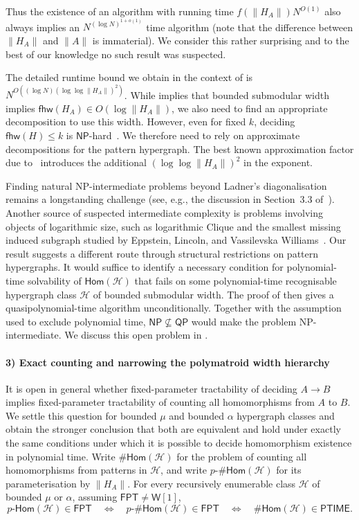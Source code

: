 \documentclass[11pt,letterpaper]{article}
\theoremstyle{definition}
\theoremstyle{remark}
\newcommand{\cH}{\mathcal H}
\newcommand{\Hom}{\mathsf{Hom}}
\newcommand{\pHom}{p\text{-}\mathsf{Hom}}
\newcommand{\fhw}{\mathsf{fhw}}
\newcommand{\FPT}{\ensuremath{\mathsf{FPT}}}
\newcommand{\PTIME}{\mathsf{PTIME}}
\newcommand{\NP}{\mathsf{NP}}
\newcommand{\QP}{\mathsf{QP}}
\newcommand{\wone}{\ensuremath{\mathsf{W}[1]}}
\providecommand{\fhw}{\operatorname{fhw}}
\providecommand{\FPT}{\ensuremath{\mathsf{FPT}}}
\providecommand{\PTIME}{\mathsf{PTIME}}
\begin{document}
Thus the existence of an algorithm with running time $f(\lVert H_A\rVert)N^{O(1)}$ also always implies an $N^{(\log N)^{1+o(1)}}$ time algorithm (note that the difference between $\lVert H_A\rVert$ and $\lVert A \rVert$ is immaterial).
We consider this rather surprising and to the best of our knowledge no such result was suspected.

The detailed runtime bound we obtain in the context of   is $N^{O((\log N)(\log\log \lVert H_A \rVert)^2)}$. While  implies that bounded submodular width implies $\fhw(H_A) \in O(\log \lVert H_A \rVert)$, we also need to find an appropriate decomposition to use this width. However, even for fixed $k$, deciding $\fhw(H)\le k$ is $\NP$-hard~\cite{DBLP:journals/jacm/GottlobLPR21}. We therefore need to rely on approximate decompositions for the pattern hypergraph. The best known approximation factor due to~\cite{KorchemnaEtAl2024} introduces the additional $(\log\log \lVert H_A \rVert)^2$ in the exponent.


Finding natural NP-intermediate problems beyond Ladner's diagonalisation remains a longstanding challenge (see, e.g., the discussion in Section~3.3 of~\cite{AroraBarak2009}). Another source of suspected intermediate complexity is problems involving objects of logarithmic size, such as logarithmic Clique and the smallest missing induced subgraph studied by Eppstein, Lincoln, and Vassilevska Williams~\cite{EppsteinLincolnWilliams2023}. Our result suggests a different route through structural restrictions on pattern hypergraphs. It would suffice to identify a necessary condition for polynomial-time solvability of $\Hom(\cH)$ that fails on some polynomial-time recognisable hypergraph class $\cH$ of bounded submodular width. The proof of  then gives a quasipolynomial-time algorithm unconditionally. Together with the assumption used to exclude polynomial time, $\NP\nsubseteq\QP$ would make the problem NP-intermediate. We discuss this open problem in .


\paragraph{3) Exact counting and narrowing the polymatroid width hierarchy}
It is open in general whether fixed-parameter tractability of deciding
$A\to B$ implies fixed-parameter tractability of counting all
homomorphisms from $A$ to $B$. We settle this question for
bounded $\mu$ and bounded $\alpha$ hypergraph classes and obtain the stronger conclusion that both are equivalent and hold under exactly the same conditions under which it is possible to decide homomorphism existence in polynomial time. Write $\mathsf{\#Hom}(\cH)$ for the problem of counting all homomorphisms from patterns in $\cH$, and write $p\text{-}\mathsf{\#Hom}(\cH)$ for its parameterisation by $\lVert H_A\rVert$. For every recursively enumerable class $\cH$ of bounded $\mu$ or $\alpha$, assuming $\FPT \ne \wone$,
\[
 \pHom(\cH)\in\FPT
 \quad\Longleftrightarrow\quad
 p\text{-}\mathsf{\#Hom}(\cH)\in\FPT
 \quad\Longleftrightarrow\quad
 \mathsf{\#Hom}(\cH)\in\PTIME.
\]
\end{document}
